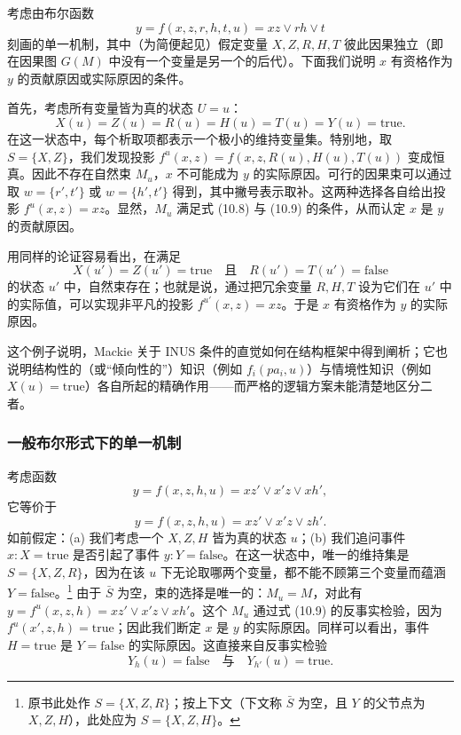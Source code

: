 考虑由布尔函数
\[
y=f(x,z,r,h,t,u)=xz\vee rh\vee t
\]
刻画的单一机制，其中（为简便起见）假定变量 $X,Z,R,H,T$ 彼此因果独立（即在因果图 $G(M)$ 中没有一个变量是另一个的后代）。下面我们说明 $x$ 有资格作为 $y$ 的贡献原因或实际原因的条件。

首先，考虑所有变量皆为真的状态 $U=u$：
\[
X(u)=Z(u)=R(u)=H(u)=T(u)=Y(u)=\text{true}.
\]
在这一状态中，每个析取项都表示一个极小的维持变量集。特别地，取 $S=\{X,Z\}$，我们发现投影 $f^u(x,z)=f(x,z,R(u),H(u),T(u))$ 变成恒真。因此不存在自然束 $M_u$，$x$ 不可能成为 $y$ 的实际原因。可行的因果束可以通过取 $w=\{r',t'\}$ 或 $w=\{h',t'\}$ 得到，其中撇号表示取补。这两种选择各自给出投影 $f^u(x,z)=xz$。显然，$M_u$ 满足式 \textup{(10.8)} 与 \textup{(10.9)} 的条件，从而认定 $x$ 是 $y$ 的贡献原因。

用同样的论证容易看出，在满足
\[
X(u')=Z(u')=\text{true}\quad\text{且}\quad R(u')=T(u')=\text{false}
\]
的状态 $u'$ 中，自然束存在；也就是说，通过把冗余变量 $R,H,T$ 设为它们在 $u'$ 中的实际值，可以实现非平凡的投影 $f^{u'}(x,z)=xz$。于是 $x$ 有资格作为 $y$ 的实际原因。

这个例子说明，Mackie 关于 INUS 条件的直觉如何在结构框架中得到阐析；它也说明结构性的（或“倾向性的”）知识（例如 $f_i(pa_i,u)$）与情境性知识（例如 $X(u)=\text{true}$）各自所起的精确作用——而严格的逻辑方案未能清楚地区分二者。

\subsubsection*{一般布尔形式下的单一机制}

考虑函数
\begin{equation}
y=f(x,z,h,u)=xz'\vee x'z\vee xh',\tag{10.12}
\end{equation}
它等价于
\begin{equation}
y=f(x,z,h,u)=xz'\vee x'z\vee zh'.\tag{10.13}
\end{equation}
如前假定：(a) 我们考虑一个 $X,Z,H$ 皆为真的状态 $u$；(b) 我们追问事件 $x:X=\text{true}$ 是否引起了事件 $y:Y=\text{false}$。在这一状态中，唯一的维持集是 $S=\{X,Z,R\}$，因为在该 $u$ 下无论取哪两个变量，都不能不顾第三个变量而蕴涵 $Y=\text{false}$。\footnote{原书此处作 $S=\{X,Z,R\}$；按上下文（下文称 $\bar S$ 为空，且 $Y$ 的父节点为 $X,Z,H$），此处应为 $S=\{X,Z,H\}$。} 由于 $\bar S$ 为空，束的选择是唯一的：$M_u=M$，对此有 $y=f^u(x,z,h)=xz'\vee x'z\vee xh'$。这个 $M_u$ 通过式 \textup{(10.9)} 的反事实检验，因为 $f^u(x',z,h)=\text{true}$；因此我们断定 $x$ 是 $y$ 的实际原因。同样可以看出，事件 $H=\text{true}$ 是 $Y=\text{false}$ 的实际原因。这直接来自反事实检验
\[
Y_h(u)=\text{false}\quad\text{与}\quad Y_{h'}(u)=\text{true}.
\]


